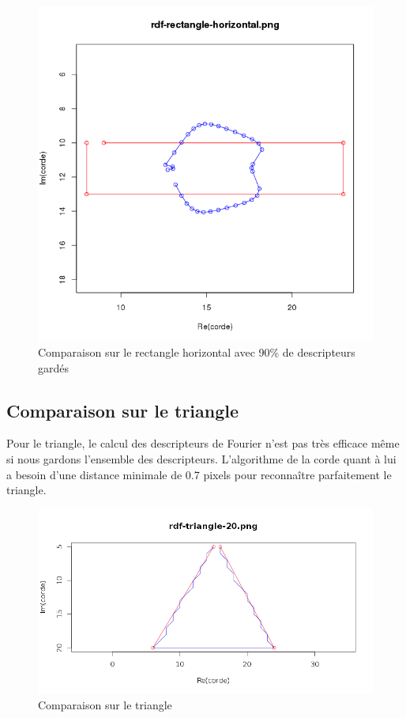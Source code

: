 \documentclass[11pt]{article}
\begin{document}
  \begin{center}
    \begin{figure}[!h]
      \includegraphics[width=15cm]{../resultat/comp_rate_rect.png}
      \caption{Comparaison sur le rectangle horizontal avec 90\% de descripteurs gardés}
    \end{figure}
  \end{center}
  
  \subsection{Comparaison sur le triangle}
  Pour le triangle, le calcul des descripteurs de Fourier n'est pas très efficace même si nous gardons
  l'ensemble des descripteurs. L'algorithme de la corde quant à lui a besoin d'une distance minimale de 0.7 pixels pour
  reconnaître parfaitement le triangle.
  
  \begin{center}
    \begin{figure}[!h]
      \includegraphics[width=15cm]{../resultat/comp_triangle.png}
      \caption{Comparaison sur le triangle}
    \end{figure}
  \end{center}
  
\end{document}
